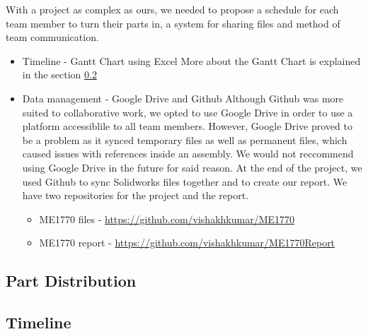 

With a project as complex as ours, we needed to propose a schedule for each team member to turn their parts in, a system for sharing files and method of team communication.

\begin{itemize}
\item Timeline - Gantt Chart using Excel
More about the Gantt Chart is explained in the section \ref{sec:timeline}

\item Data management - Google Drive and Github
Although Github was more suited to collaborative work, we opted to use Google Drive in order to use a platform accessiblile to all team members. However, Google Drive proved to be a problem as it synced temporary files as well as permanent files, which caused issues with references inside an assembly. 
We would not reccommend using Google Drive in the future for said reason. At the end of the project, we used Github to sync Solidworks files together and to create our report.
We have two repositories for the project and the report.
\begin{itemize}
\item ME1770 files  - \url{https://github.com/vishakhkumar/ME1770}
\item ME1770 report - \url{https://github.com/vishakhkumar/ME1770Report}
\end{itemize}

\end{itemize}

\subsection{Part Distribution}


\subsection{Timeline} \label{sec:timeline}
 
\clearpage
